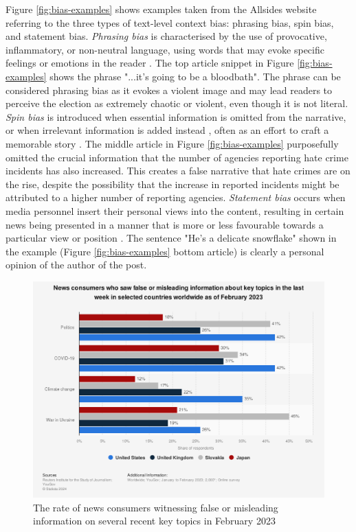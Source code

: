 Figure \ref{fig:bias-examples} shows examples taken from the Allsides website \cite{allsides-media-bias-types} referring to the three types of text-level context bias: phrasing bias, spin bias, and statement bias. \textit{Phrasing bias} is characterised by the use of provocative, inflammatory, or non-neutral language, using words that may evoke specific feelings or emotions in the reader \cite{spinde-2024-taxonomy,hube-2019-neural-biased-language}. The top article snippet in Figure \ref{fig:bias-examples} shows the phrase "...it's going to be a bloodbath". The phrase can be considered phrasing bias as it evokes a violent image and may lead readers to perceive the election as extremely chaotic or violent, even though it is not literal. \textit{Spin bias} is introduced when essential information is omitted from the narrative, or when irrelevant information is added instead \cite{spinde-2024-taxonomy}, often as an effort to craft a memorable story \cite{mullainathan-2002-media-bias}. The middle article in Figure \ref{fig:bias-examples} purposefully omitted the crucial information that the number of agencies reporting hate crime incidents has also increased. This creates a false narrative that hate crimes are on the rise, despite the possibility that the increase in reported incidents might be attributed to a higher number of reporting agencies. \textit{Statement bias} occurs when media personnel insert their personal views into the content, resulting in certain news being presented in a manner that is more or less favourable towards a particular view or position \cite{spinde-2024-taxonomy,d-alessio-2000-meta-analysis}. The sentence "He's a delicate snowflake" shown in the example (Figure \ref{fig:bias-examples} bottom article) is clearly a personal opinion of the author of the post.

\begin{figure}[htbp]
    \centering
    \includegraphics[width=0.7\linewidth]{images/statistic_id1317019_consumers-witnessing-false-information-on-certain-topics-worldwide-2023.png}
    \caption{The rate of news consumers witnessing false or misleading information on several recent key topics in February 2023 \cite{reuters-2023-false-info}}
    \label{fig:consumers-witnessing-false-information-on-certain-topics-worldwide-2023}
\end{figure}


